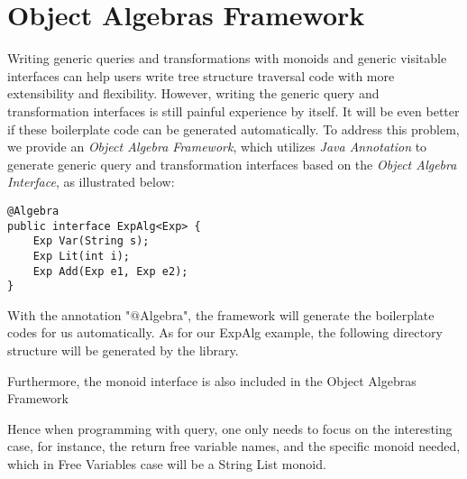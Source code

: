 \section{Object Algebras Framework}

Writing generic queries and transformations with monoids and generic visitable interfaces can help users write tree structure traversal code with more extensibility and flexibility. However, writing the generic query and transformation interfaces is still painful experience by itself. It will be even better if these boilerplate code can be generated automatically. To address this problem, we provide an \emph{Object Algebra Framework}, which utilizes \emph{Java Annotation} to generate generic query and transformation interfaces based on the \emph{Object Algebra Interface}, as illustrated below: 
\begin{lstlisting}[numbers=none] 
@Algebra
public interface ExpAlg<Exp> {
	Exp Var(String s);
	Exp Lit(int i);
	Exp Add(Exp e1, Exp e2);
}
\end{lstlisting}

With the annotation "$@$Algebra", the framework will generate the boilerplate codes for us automatically. As for our ExpAlg example, the following directory structure will be generated by the library. 

Furthermore, the monoid interface is also included in the Object Algebras Framework

Hence when programming with query, one only needs to focus on the interesting case, for instance, the return free variable names, and the specific monoid needed, which in Free Variables case will be a String List monoid.